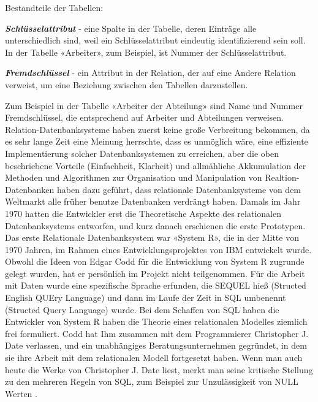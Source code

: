  
Bestandteile der Tabellen: 

\textit{\textbf{Schlüsselattribut}} - eine Spalte in der Tabelle, deren Einträge alle unterschiedlich sind, weil ein Schlüsselattribut eindeutig identifizierend sein soll. In der Tabelle «Arbeiter», zum Beispiel, ist Nummer der Schlüsselattribut.

\textit{\textbf{Fremdschlüssel}} - ein Attribut in der Relation, der auf eine Andere Relation verweist, um eine Beziehung zwischen den Tabellen darzustellen.

Zum Beispiel in der Tabelle «Arbeiter der Abteilung» sind Name und Nummer Fremdschlüssel, die entsprechend auf Arbeiter und Abteilungen verweisen. 
Relation-Datenbanksysteme haben zuerst keine große Verbreitung bekommen, da es sehr lange Zeit eine Meinung herrschte, dass es unmöglich wäre, eine effiziente Implementierung solcher Datenbanksystemen zu erreichen, aber die oben beschriebene Vorteile (Einfachheit, Klarheit) und allmähliche Akkumulation der Methoden und Algorithmen zur Organisation und Manipulation von Realtion-Datenbanken haben dazu geführt, dass relationale Datenbanksysteme von dem Weltmarkt alle früher benutze Datenbanken verdrängt haben. Damals im Jahr 1970 hatten die Entwickler erst die Theoretische Aspekte des relationalen Datenbanksystems entworfen, und kurz danach erschienen die erste Prototypen. Das erste Relationale Datenbanksystem war «System R», die in der Mitte von 1970 Jahren, im Rahmen eines Entwicklungsprojektes von IBM entwickelt wurde. Obwohl die Ideen von Edgar Codd für die Entwicklung von System R zugrunde gelegt wurden, hat er persönlich im Projekt nicht teilgenommen. Für die Arbeit mit Daten wurde eine spezifische Sprache erfunden, die SEQUEL hieß (Structed English QUEry Language) und dann im Laufe der Zeit in SQL umbenennt (Structed Query Language) wurde. Bei dem Schaffen von SQL haben die Entwickler von System R haben die Theorie eines relationalen Modelles ziemlich frei formuliert. Codd hat Ihm zusammen mit dem Programmierer Christopher J. Date verlassen, und ein unabhängiges Beratungsunternehmen gegründet, in dem sie ihre Arbeit mit dem relationalen Modell fortgesetzt haben. Wenn man auch heute die Werke von Christopher J. Date liest, merkt man seine kritische Stellung zu den mehreren Regeln von SQL, zum Beispiel zur Unzulässigkeit von NULL Werten \cite{date2006introduction}.

